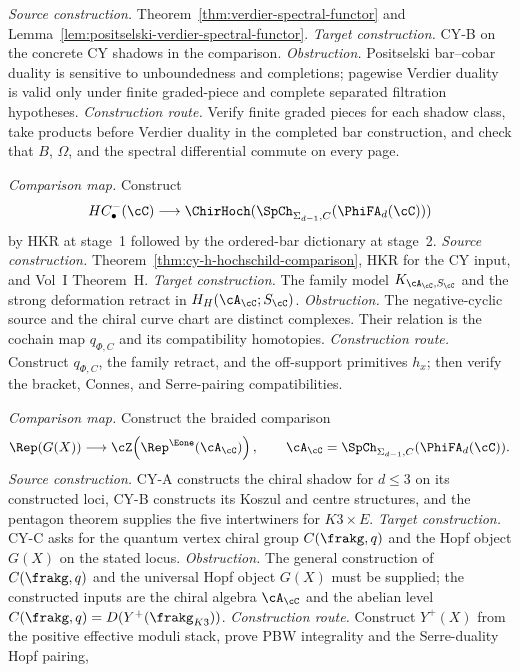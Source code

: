 \begin{description}[leftmargin=2.7em,style=nextline,topsep=0.3ex,itemsep=0.6ex]
 \emph{Source construction.}
 Theorem~\ref{thm:verdier-spectral-functor} and
 Lemma~\ref{lem:positselski-verdier-spectral-functor}.
 \emph{Target construction.}
	 CY-B on the concrete CY shadows in the comparison.
 \emph{Obstruction.}
 Positselski bar--cobar duality is sensitive to unboundedness and
 completions; pagewise Verdier duality is valid only under finite
 graded-piece and complete separated filtration hypotheses.
 \emph{Construction route.}
 Verify finite graded pieces for each shadow class, take products
 before Verdier duality in the completed bar construction, and check
 that \(B\), \(\Omega\), and the spectral differential commute on
 every page.
 \item[\textbf{CM--H. CY-H Hochschild comparison/truncation.}]
 \emph{Comparison map.}
 Construct
 \[
 HC^-_\bullet(\cC)
 \longrightarrow
 \ChirHoch(\SpCh_{\Sigma_{d-1},C}(\PhiFA_d(\cC)))
 \]
 by HKR at stage~1 followed by the ordered-bar dictionary at stage~2.
 \emph{Source construction.}
 Theorem~\ref{thm:cy-h-hochschild-comparison}, HKR for the CY input,
 and Vol~I Theorem~H.
 \emph{Target construction.}
 The family model $K_{\cA_\cC,S_\cC}$ and the strong deformation
 retract in $H_H(\cA_\cC;S_\cC)$.
 \emph{Obstruction.}
 The negative-cyclic source and the chiral curve chart are distinct
 complexes.  Their relation is the cochain map $q_{\Phi,C}$ and its
 compatibility homotopies.
 \emph{Construction route.}
 Construct $q_{\Phi,C}$, the family retract, and the off-support
 primitives $h_x$; then verify the bracket, Connes, and Serre-pairing
 compatibilities.
 \item[\textbf{CM--C. Specialisation-stratified CY-C.}]
 \emph{Comparison map.}
 Construct the braided comparison
 \[
 \Rep(G(X)) \longrightarrow
 \cZ\!\left(\Rep^{\Eone}(\cA_\cC)\right),
 \qquad
 \cA_\cC=\SpCh_{\Sigma_{d-1}, C}(\PhiFA_d(\cC)).
 \]
 \emph{Source construction.}
 CY-A constructs the chiral shadow for $d\leq3$ on its
 constructed loci, CY-B constructs its Koszul and centre
 structures, and the pentagon theorem supplies the five
 intertwiners for $K3\times E$.
 \emph{Target construction.}
 CY-C asks for the quantum vertex chiral group
 \(C(\frakg,q)\) and the Hopf object \(G(X)\) on the stated locus.
 \emph{Obstruction.}
 The general construction of $C(\frakg,q)$ and the universal
 Hopf object $G(X)$ must be supplied; the constructed inputs
 are the chiral algebra $\cA_\cC$ and the abelian level
 $C(\frakg,q)=D(Y^+(\frakg_{K3}))$.
 \emph{Construction route.}
 Construct $Y^+(X)$ from the positive effective moduli stack,
 prove PBW integrality and the Serre-duality Hopf pairing,

\end{description}
